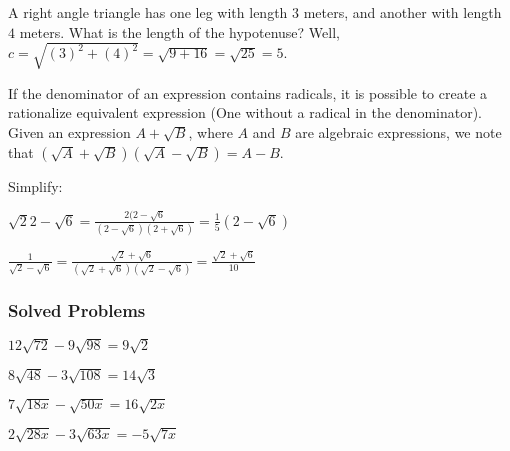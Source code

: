 \documentclass[crop=false,class=book,oneside]{standalone}
\begin{document}
        \begin{example}
        A right angle triangle has one leg with length $3$ meters, and another with length $4$ meters. What is the length of the hypotenuse? Well, $c = \sqrt{(3)^2+(4)^2} = \sqrt{9+16} = \sqrt{25} = 5$.
        \end{example}
        \begin{remark}
        If the denominator of an expression contains radicals, it is possible to create a rationalize equivalent expression (One without a radical in the denominator). Given an expression $A+\sqrt{B}$, where $A$ and $B$ are algebraic expressions, we note that $(\sqrt{A}+\sqrt{B})(\sqrt{A}-\sqrt{B}) = A-B$. 
        \end{remark}
        \begin{example}
        Simplify:
        \begin{enumerate}
        \begin{multicols}{2}
        \item $\sqrt{2}{2-\sqrt{6}} = \frac{2(2-\sqrt{6}}{(2-\sqrt{6})(2+\sqrt{6})} = \frac{1}{5}(2-\sqrt{6})$
        \item $\frac{1}{\sqrt{2}-\sqrt{6}} = \frac{\sqrt{2}+\sqrt{6}}{(\sqrt{2}+\sqrt{6})(\sqrt{2}-\sqrt{6})} = \frac{\sqrt{2}+\sqrt{6}}{10}$
        \end{multicols}
        \end{enumerate}
        \end{example}
        \subsubsection{Solved Problems}
        \begin{enumerate}
        \begin{multicols}{4}
        \item $12\sqrt{72} - 9\sqrt{98} = 9\sqrt{2}$
        \item $8\sqrt{48} - 3\sqrt{108} = 14\sqrt{3}$
        \item $7\sqrt{18x} - \sqrt{50x} = 16\sqrt{2x}$
        \item $2\sqrt{28x} - 3\sqrt{63x} = -5\sqrt{7x}$
        \end{multicols}
        \end{enumerate}
\end{document}
